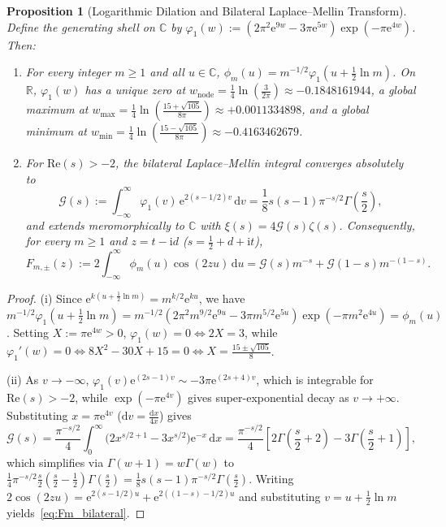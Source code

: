 \documentclass[11pt,reqno]{amsart}
\newtheorem{proposition}[theorem]{Proposition}
\theoremstyle{definition}
\theoremstyle{remark}
\numberwithin{equation}{section}
\newcommand{\R}{\mathbb{R}}
\newcommand{\C}{\mathbb{C}}
\newcommand{\dd}{\mathrm{d}}
\newcommand{\ii}{\mathrm{i}}
\newcommand{\ee}{\mathrm{e}}
\newcommand{\Rea}{\mathrm{Re}}
\begin{document}
\begin{proposition}[Logarithmic Dilation and Bilateral Laplace--Mellin Transform]\label{prop:dilation}
Define the generating shell on $\C$ by $\varphi_1(w) := (2\pi^2\ee^{9w} - 3\pi\ee^{5w})\exp(-\pi\ee^{4w})$. Then:
\begin{enumerate}[label=\textup{(\roman*)},leftmargin=2.2em]
\item For every integer $m \ge 1$ and all $u \in \C$, $\phi_m(u) = m^{-1/2}\varphi_1(u + \frac{1}{2}\ln m)$. On $\R$, $\varphi_1(w)$ has a unique zero at $w_{\mathrm{node}} = \frac{1}{4}\ln(\frac{3}{2\pi}) \approx -0.1848161944$, a global maximum at $w_{\max} = \frac{1}{4}\ln(\frac{15+\sqrt{105}}{8\pi}) \approx +0.0011334898$, and a global minimum at $w_{\min} = \frac{1}{4}\ln(\frac{15-\sqrt{105}}{8\pi}) \approx -0.4163462679$.
\item For $\Rea(s) > -2$, the bilateral Laplace--Mellin integral converges absolutely to
\begin{equation}\label{eq:G_mellin_exact}
\mathcal{G}(s) := \int_{-\infty}^{\infty} \varphi_1(v)\,\ee^{2(s - 1/2)v}\,\dd v = \frac{1}{8}s(s-1)\pi^{-s/2}\Gamma\!\left(\frac{s}{2}\right),
\end{equation}
and extends meromorphically to $\C$ with $\xi(s) = 4\mathcal{G}(s)\zeta(s)$. Consequently, for every $m \ge 1$ and $z = t - \ii d$ ($s = \frac{1}{2} + d + \ii t$),
\begin{equation}\label{eq:Fm_bilateral}
F_{m,\pm}(z) := 2\int_{-\infty}^{\infty} \phi_m(u)\cos(2zu)\,\dd u = \mathcal{G}(s)m^{-s} + \mathcal{G}(1-s)m^{-(1-s)}.
\end{equation}
\end{enumerate}
\end{proposition}

\begin{proof}
(i) Since $\ee^{k(u + \frac{1}{2}\ln m)} = m^{k/2}\ee^{ku}$, we have $m^{-1/2}\varphi_1(u + \frac{1}{2}\ln m) = m^{-1/2}(2\pi^2 m^{9/2}\ee^{9u} - 3\pi m^{5/2}\ee^{5u})\exp(-\pi m^2\ee^{4u}) = \phi_m(u)$. Setting $X := \pi\ee^{4w} > 0$, $\varphi_1(w) = 0 \iff 2X = 3$, while $\varphi_1'(w) = 0 \iff 8X^2 - 30X + 15 = 0 \iff X = \frac{15 \pm \sqrt{105}}{8}$.

(ii) As $v \to -\infty$, $\varphi_1(v)\ee^{(2s-1)v} \sim -3\pi\ee^{(2s+4)v}$, which is integrable for $\Rea(s) > -2$, while $\exp(-\pi\ee^{4v})$ gives super-exponential decay as $v \to +\infty$. Substituting $x = \pi\ee^{4v}$ ($\dd v = \frac{\dd x}{4x}$) gives
\[
\mathcal{G}(s) = \frac{\pi^{-s/2}}{4}\int_0^{\infty} \bigl(2x^{s/2+1} - 3x^{s/2}\bigr)\ee^{-x}\,\dd x = \frac{\pi^{-s/2}}{4}\left[2\Gamma\!\left(\frac{s}{2}+2\right) - 3\Gamma\!\left(\frac{s}{2}+1\right)\right],
\]
which simplifies via $\Gamma(w+1) = w\Gamma(w)$ to $\frac{1}{4}\pi^{-s/2}\frac{s}{2}(\frac{s}{2} - \frac{1}{2})\Gamma(\frac{s}{2}) = \frac{1}{8}s(s-1)\pi^{-s/2}\Gamma(\frac{s}{2})$. Writing $2\cos(2zu) = \ee^{2(s-1/2)u} + \ee^{2((1-s)-1/2)u}$ and substituting $v = u + \frac{1}{2}\ln m$ yields~\eqref{eq:Fm_bilateral}.
\end{proof}
\end{document}
